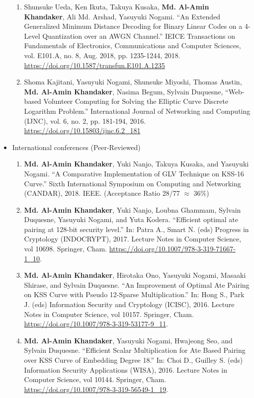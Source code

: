 \begin{itemize}
\begin{enumerate}
	\item	Shunsuke Ueda, Ken Ikuta, Takuya Kusaka,  \textbf{Md. Al-Amin Khandaker}, Ali Md. Arshad, Yasuyuki Nogami. ``An Extended Generalized Minimum Distance Decoding for Binary Linear Codes on a 4-Level Quantization over an AWGN Channel.'' IEICE Transactions on Fundamentals of Electronics, Communications and Computer Sciences, vol. E101.A, no. 8, Aug. 2018, pp. 1235-1244, 2018. \url{https://doi.org/10.1587/transfun.E101.A.1235}
	
	\item Shoma Kajitani, Yasuyuki Nogami, Shunsuke Miyoshi, Thomas Austin, \textbf{Md. Al-Amin Khandaker}, Nasima Begum, Sylvain Duquesne, ``Web-based Volunteer Computing for Solving the Elliptic Curve Discrete Logarithm Problem.'' International Journal of Networking and Computing (IJNC), vol. 6, no. 2, pp. 181-194, 2016.
	\url{https://doi.org/10.15803/ijnc.6.2_181}
	
\end{enumerate}
\newpage
\item International conferences (Peer-Reviewed)
\normalsize
\begin{enumerate}
	
	\item \textbf{Md. Al-Amin Khandaker}, Yuki Nanjo, Takuya Kusaka, and Yasuyuki Nogami. ``A Comparative Implementation of GLV Technique on KSS-16 Curve.'' Sixth International Symposium on Computing and Networking (CANDAR), 2018. IEEE. (Acceptance Ratio 28/77 $\approx$ 36\%)
	
	\item \textbf{Md. Al-Amin Khandaker}, Yuki Nanjo, Loubna Ghammam, Sylvain Duquesne, Yasuyuki Nogami, and Yuta Kodera. ``Efficient optimal ate pairing at 128-bit security level.'' In: Patra A., Smart N. (eds) Progress in Cryptology (INDOCRYPT), 2017. Lecture Notes in Computer Science, vol 10698. Springer, Cham.
	\url{https://doi.org/10.1007/978-3-319-71667-1_10}.
	
	\item \textbf{Md. Al-Amin Khandaker}, Hirotaka Ono, Yasuyuki Nogami, Masaaki Shirase, and Sylvain Duquesne. ``An Improvement of Optimal Ate Pairing on KSS Curve with Pseudo 12-Sparse Multiplication.'' In: Hong S., Park J. (eds) Information Security and Cryptology (ICISC), 2016. Lecture Notes in Computer Science, vol 10157. Springer, Cham. \url{https://doi.org/10.1007/978-3-319-53177-9_11}.
	
		\item \textbf{Md. Al-Amin Khandaker}, Yasuyuki Nogami, Hwajeong Seo, and Sylvain Duquesne. ``Efficient Scalar Multiplication for Ate Based Pairing over KSS Curve of Embedding Degree 18.'' In: Choi D., Guilley S. (eds) Information Security Applications (WISA), 2016. Lecture Notes in Computer Science, vol 10144. Springer, Cham. \url{https://doi.org/10.1007/978-3-319-56549-1_19}. 


\end{enumerate}
\end{itemize}
